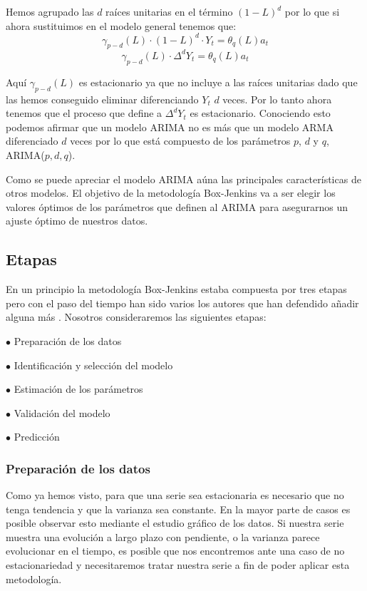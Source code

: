 Hemos agrupado las $d$ raíces unitarias en el término $(1-L)^{d}$ por lo que si ahora sustituimos en el modelo general tenemos que:
\begin{equation}
\gamma_{p-d}(L)\cdot(1-L)^{d}\cdot Y_{t}=\theta_{q}(L)a_{t}
\end{equation}
\begin{equation}
\gamma_{p-d}(L)\cdot\Delta^{d}Y_{t}=\theta_{q}(L)a_{t}
\end{equation}

Aquí $\gamma_{p-d}(L)$ es estacionario ya que no incluye a las raíces unitarias dado que las hemos conseguido eliminar diferenciando $Y_{t}$ $d$ veces. Por lo tanto ahora tenemos que el proceso que define a $\Delta^{d}Y_{t}$ es estacionario. Conociendo esto podemos afirmar que un modelo ARIMA no es más que un modelo ARMA diferenciado $d$ veces por lo que está compuesto de los parámetros $p$, $d$ y $q$, ARIMA($p, d, q$).

Como se puede apreciar el modelo ARIMA aúna las principales características de otros modelos. El objetivo de la metodología Box-Jenkins va a ser elegir los valores óptimos de los parámetros que definen al ARIMA para asegurarnos un ajuste óptimo de nuestros datos.

\subsection{Etapas}
En un principio la metodología Box-Jenkins estaba compuesta por tres etapas pero con el paso del tiempo han sido varios los autores que han defendido añadir alguna más \cite{etapas}. Nosotros consideraremos las siguientes etapas:
\begin{itemize*}
    \item[$\bullet$]Preparación de los datos
    \item[$\bullet$]Identificación y selección del modelo
    \item[$\bullet$]Estimación de los parámetros
    \item[$\bullet$]Validación del modelo
    \item[$\bullet$]Predicción
\end{itemize*}

\subsubsection{Preparación de los datos}
Como ya hemos visto, para que una serie sea estacionaria es necesario que no tenga tendencia y que la varianza sea constante. En la mayor parte de casos es posible observar esto mediante el estudio gráfico de los datos. Si nuestra serie muestra una evolución a largo plazo con pendiente, o la varianza parece evolucionar en el tiempo, es posible que nos encontremos ante una caso de no estacionariedad y necesitaremos tratar nuestra serie a fin de poder aplicar esta metodología.

